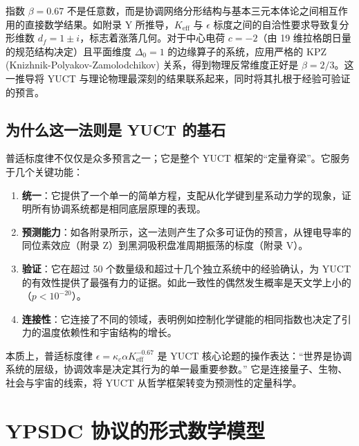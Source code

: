 \documentclass[11pt,a4paper]{article}
\begin{document}
	指数 \(\beta = 0.67\) 不是任意数，而是协调网络分形结构与基本三元本体论之间相互作用的直接数学结果。如附录 Y 所推导，\(K_{\mathrm{eff}}\) 与 \(\epsilon\) 标度之间的自洽性要求导致复分形维数 \(d_f = 1 \pm i\)，标志着涨落几何。对于中心电荷 \(c = -2\)（由 19 维拉格朗日量的规范结构决定）且平面维度 \(\Delta_0 = 1\) 的边缘算子的系统，应用严格的 KPZ (Knizhnik-Polyakov-Zamolodchikov) 关系，得到物理反常维度正好是 \(\beta = 2/3\)。这一推导将 YUCT 与理论物理最深刻的结果联系起来，同时将其扎根于经验可验证的预言。
	
	\subsection{为什么这一法则是 YUCT 的基石}
	
	普适标度律不仅仅是众多预言之一；它是整个 YUCT 框架的“定量脊梁”。它服务于几个关键功能：
	
	\begin{enumerate}
		\item \textbf{统一}：它提供了一个单一的简单方程，支配从化学键到星系动力学的现象，证明所有协调系统都是相同底层原理的表现。
		\item \textbf{预测能力}：如各附录所示，这一法则产生了众多可证伪的预言，从锂电导率的同位素效应（附录 Z）到黑洞吸积盘准周期振荡的标度（附录 V）。
		\item \textbf{验证}：它在超过 50 个数量级和超过十几个独立系统中的经验确认，为 YUCT 的有效性提供了最强有力的证据。如此一致性的偶然发生概率是天文学上小的（\(p < 10^{-20}\)）。
		\item \textbf{连接性}：它连接了不同的领域，表明例如控制化学键能的相同指数也决定了引力的温度依赖性和宇宙结构的增长。
	\end{enumerate}
	
	本质上，普适标度律 \(\epsilon = \kappa_c \alpha K_{\mathrm{eff}}^{-0.67}\) 是 YUCT 核心论题的操作表达：“世界是协调系统的层级，协调效率是决定其行为的单一最重要参数。” 它是连接量子、生物、社会与宇宙的线索，将 YUCT 从哲学框架转变为预测性的定量科学。
	
	
	\section{YPSDC 协议的形式数学模型}
	\label{sec:formal-model}
	
\end{document}
